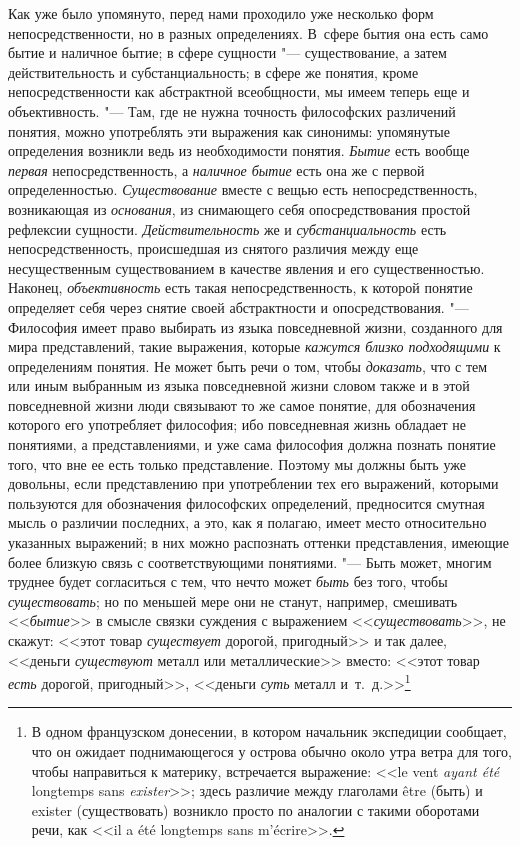 Как уже было упомянуто, перед нами проходило уже несколько
форм непосредственности, но в разных определениях. В~сфере бытия она есть
само бытие и наличное бытие; в сфере сущности
"--- существование, а затем действительность и
субстанциальность; в сфере же понятия, кроме непосредственности как
абстрактной всеобщности, мы имеем теперь еще и объективность. "---
Там, где не нужна точность философских различений понятия,
можно употреблять эти выражения как синонимы: упомянутые определения
возникли ведь из необходимости понятия. {\em Бытие} есть вообще
{\em первая} непосредственность, а {\em наличное бытие} есть
она же с первой определенностью. {\em Существование}
вместе с вещью есть непосредственность, возникающая из {\em основания}, из
снимающего себя опосредствования простой рефлексии сущности.
{\em Действительность} же и {\em субстанциальность}
есть непосредственность, происшедшая из снятого различия
между еще несущественным существованием в качестве явления и его
существенностью. Наконец, {\em объективность} есть
такая непосредственность, к которой понятие определяет себя через снятие
своей абстрактности и опосредствования. "--- Философия имеет
право выбирать из языка повседневной жизни, созданного для мира
представлений, такие выражения, которые {\em кажутся близко подходящими}
к определениям понятия. Не может быть речи о том, чтобы {\em доказать}, что
с тем или иным выбранным из языка повседневной жизни словом также и в этой
повседневной жизни люди связывают то же самое понятие, для обозначения
которого его употребляет философия; ибо повседневная жизнь
обладает не понятиями, а представлениями, и уже сама философия должна
познать понятие того, что вне ее есть только представление. Поэтому мы
должны быть уже довольны, если представлению при употреблении тех его
выражений, которыми пользуются для обозначения философских определений,
предносится смутная мысль о различии последних, а это, как я полагаю, имеет
место относительно указанных выражений; в них можно распознать оттенки
представления, имеющие более близкую связь с соответствующими понятиями. "---
Быть может, многим труднее будет согласиться с тем, что нечто
может {\em быть} без того, чтобы {\em существовать};
но по меньшей мере они не станут, например, смешивать <<{\em бытие}>> в смысле
связки суждения с выражением <<{\em существовать}>>, не
скажут: <<этот товар {\em существует}
дорогой, пригодный>> и так далее, <<деньги {\em существуют} металл
или металлические>> вместо: <<этот товар {\em есть} дорогой,
пригодный>>, <<деньги {\em суть} металл и~т.~д.>>\footnote{В одном
французском донесении, в котором начальник экспедиции
сообщает, что он ожидает поднимающегося у острова обычно около утра ветра
для того, чтобы направиться к материку, встречается выражение: <<le vent
{\em ayant été} longtemps sans
{\em exister}>>\label{bkm:bm64};
здесь различие между глаголами être (быть) и
exister (существовать) возникло просто по аналогии с такими
оборотами речи, как <<il a été longtemps sans
m'écrire>>.}
